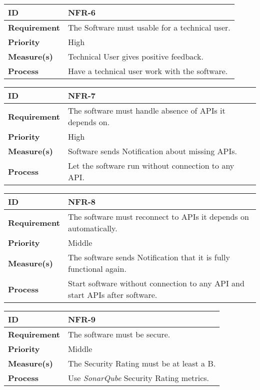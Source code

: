 \begin{center}
\begin{tabular}{ | m{8em} | m{25em}| } 
 \hline
 \textbf{ID} & NFR-6\\ 
 \hline
 \textbf{Requirement} & The Software must usable for a technical user.\\
 \hline
 \textbf{Priority} & High \\
 \hline
 \textbf{Measure(s)} & Technical User gives positive feedback.\\
 \hline
 \textbf{Process} & Have a technical user work with the software.\\
 \hline
\end{tabular}
\end{center}

\begin{center}
\begin{tabular}{ | m{8em} | m{25em}| } 
 \hline
 \textbf{ID} & NFR-7\\ 
 \hline
 \textbf{Requirement} & The software must handle absence of APIs it depends on.\\
 \hline
 \textbf{Priority} & High \\
 \hline
 \textbf{Measure(s)} & Software sends Notification about missing APIs.\\
 \hline
 \textbf{Process} & Let the software run without connection to any API.\\
 \hline
\end{tabular}
\end{center}

\begin{center}
\begin{tabular}{ | m{8em} | m{25em}| } 
 \hline
 \textbf{ID} & NFR-8\\ 
 \hline
 \textbf{Requirement} & The software must reconnect to APIs it depends on automatically.\\
 \hline
 \textbf{Priority} & Middle \\
 \hline
 \textbf{Measure(s)} & The software sends Notification that it is fully functional again.\\
 \hline
 \textbf{Process} & Start software without connection to any API and start APIs after software.\\
 \hline
\end{tabular}
\end{center}

\begin{center}
\begin{tabular}{ | m{8em} | m{25em}| } 
 \hline
 \textbf{ID} & NFR-9\\ 
 \hline
 \textbf{Requirement} & The software must be secure. \\
 \hline
 \textbf{Priority} & Middle \\
 \hline
 \textbf{Measure(s)} & The Security Rating must be at least a B. \\
 \hline
 \textbf{Process} & Use \textit{SonarQube} Security Rating metrics. \\
 \hline
\end{tabular}
\end{center}

